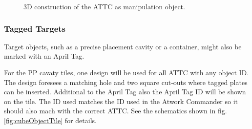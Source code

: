 {\begin{figure}[h!]
	\centering
	\hspace{0.05\textwidth}
	\caption{3D construction of the ATTC as manipulation object.}%
	\label{fig:cubeObject}
\end{figure}

\subsubsection{Tagged Targets}

Target objects, such as a precise placement cavity or a container, might also be marked with an April Tag.

For the PP cavaty tiles, one design will be used for all ATTC with any object ID. The design foresees a matching hole and two square cut-outs where tagged plates can be inserted. Additional to the April Tag also the April Tag ID will be shown on the tile.
The ID used matches the ID used in the Atwork Commander so it should also mach with the correct ATTC.
See the schematics shown in fig. \ref{fig:cubeObjectTile} for details. 

}

